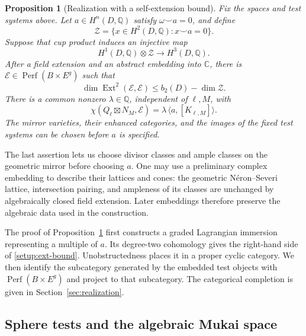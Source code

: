 \documentclass[11pt]{article}
\numberwithin{equation}{section}
\newtheorem{proposition}[theorem]{Proposition}
\theoremstyle{definition}
\theoremstyle{remark}
\begin{document}
\begin{proposition}[Realization with a self-extension bound]
\label{prop:realization}
Fix the spaces and test systems above.  Let $a\in H^n(D,\mathbb Q)$ satisfy
$\omega\smile a=0$, and define
\[
 \mathcal Z=\{x\in H^2(D,\mathbb Q):x\smile a=0\}.
\]
Suppose that cup product induces an injective map
\begin{equation}
 H^1(D,\mathbb Q)\otimes\mathcal Z\longrightarrow H^3(D,\mathbb Q).
 \label{setup:wedge-injective}
\end{equation}
After a field extension and an abstract embedding into $\mathbb C$, there is
$\mathcal E\in\operatorname{Perf}(B\times E^g)$ such that
\begin{equation}
 \dim\operatorname{Ext}^2(\mathcal E,\mathcal E)
 \le b_2(D)-\dim\mathcal Z.
 \label{setup:ext-bound}
\end{equation}
There is a common nonzero $\lambda\in\mathbb Q$, independent of $\ell,M$, with
\begin{equation}
 \chi(Q_\ell\boxtimes N_M,\mathcal E)
   =\lambda\,\langle a,[K_{\ell,M}]\rangle.
 \label{setup:euler}
\end{equation}
The mirror varieties, their enhanced categories, and the images of the
fixed test systems can be chosen before $a$ is specified.
\end{proposition}

The last assertion lets us choose divisor classes and ample classes on
the geometric mirror before choosing $a$.  One may use a preliminary
complex embedding to describe their lattices and cones: the geometric
N\'eron--Severi lattice, intersection pairing, and ampleness of its
classes are unchanged by algebraically closed field extension.  Later
embeddings therefore preserve the algebraic data used in the
construction.

The proof of Proposition~\ref{prop:realization} first constructs a graded
Lagrangian immersion representing a multiple of $a$.  Its degree-two
cohomology gives the right-hand side of \eqref{setup:ext-bound}.
Unobstructedness places it in a proper cyclic category.  We then identify
the subcategory generated by the embedded test objects with
$\operatorname{Perf}(B\times E^g)$ and project to that subcategory.  The categorical
completion is given in Section~\ref{sec:realization}.

\subsection{Sphere tests and the algebraic Mukai space}
\end{document}
